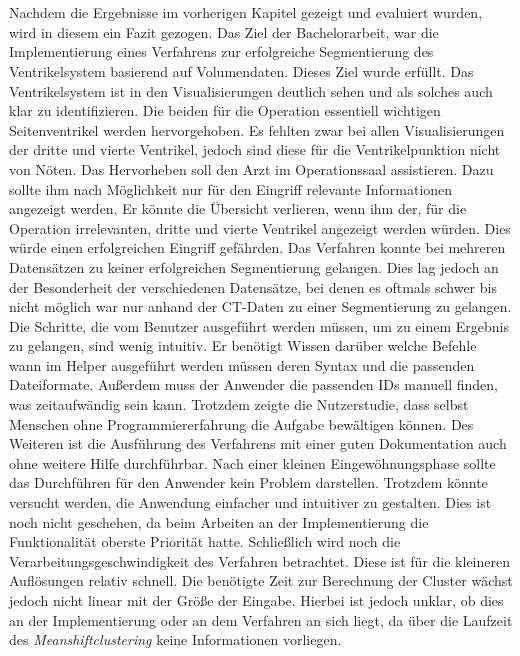 \chapter{}
\label{sec:discussion}


Nachdem die Ergebnisse im vorherigen Kapitel gezeigt und evaluiert wurden, wird in diesem ein Fazit gezogen.
\newline
Das Ziel der Bachelorarbeit, war die Implementierung eines Verfahrens zur erfolgreiche Segmentierung des Ventrikelsystem basierend auf Volumendaten. Dieses Ziel wurde erfüllt.
\newline
Das Ventrikelsystem ist in den Visualisierungen deutlich sehen und als solches auch klar zu identifizieren. Die beiden für die Operation essentiell wichtigen Seitenventrikel werden hervorgehoben.
Es fehlten zwar bei allen Visualisierungen der dritte und vierte Ventrikel, jedoch sind diese für die Ventrikelpunktion nicht von Nöten. Das Hervorheben soll den Arzt im Operationssaal assistieren. Dazu sollte ihm nach Möglichkeit nur für den Eingriff relevante Informationen angezeigt werden. Er könnte die  Übersicht verlieren, wenn ihm der, für die Operation irrelevanten, dritte und vierte Ventrikel angezeigt werden würden. Dies würde einen erfolgreichen Eingriff gefährden.
\newline
Das Verfahren konnte bei mehreren Datensätzen zu keiner erfolgreichen Segmentierung gelangen. Dies lag jedoch an der Besonderheit der verschiedenen Datensätze, bei denen es oftmals schwer bis nicht möglich war nur anhand der CT-Daten zu einer Segmentierung zu gelangen.
\newline
Die Schritte, die vom Benutzer ausgeführt werden müssen, um zu einem Ergebnis zu gelangen, sind wenig intuitiv. Er benötigt Wissen darüber welche Befehle wann im Helper ausgeführt werden müssen deren Syntax und die passenden Dateiformate. Außerdem muss der Anwender die passenden IDs manuell finden, was zeitaufwändig sein kann.
\newline
Trotzdem zeigte die Nutzerstudie, dass selbst Menschen ohne Programmiererfahrung die Aufgabe bewältigen können. Des Weiteren ist die Ausführung des Verfahrens mit einer guten Dokumentation auch ohne weitere Hilfe durchführbar. Nach einer kleinen Eingewöhnungsphase sollte das Durchführen für den Anwender kein Problem darstellen.
Trotzdem könnte versucht werden, die Anwendung einfacher und intuitiver zu gestalten. Dies ist noch nicht geschehen, da beim Arbeiten an der Implementierung die Funktionalität oberste Priorität hatte.
\newline
Schließlich wird noch die Verarbeitungsgeschwindigkeit des Verfahren betrachtet. Diese ist für die kleineren Auflösungen relativ schnell. Die benötigte Zeit zur Berechnung der Cluster wächst jedoch nicht linear mit der Größe der Eingabe. Hierbei ist jedoch unklar, ob dies an der Implementierung oder an dem Verfahren an sich liegt, da über die Laufzeit des \textit{Meanshiftclustering} keine Informationen vorliegen.


